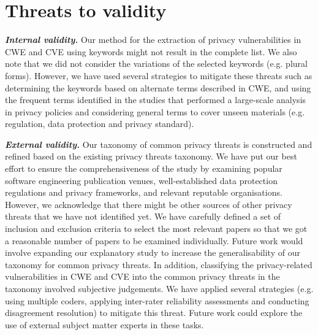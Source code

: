 \section{Threats to validity} \label{sec:threats}

\textit{\textbf{Internal validity.}} Our method for the extraction of privacy vulnerabilities in CWE and CVE using keywords might not result in the complete list. We also note that we did not consider the variations of the selected keywords (e.g. plural forms). However, we have used several strategies to mitigate these threats such as determining the keywords based on alternate terms described in CWE, and using the frequent terms identified in the studies that performed a large-scale analysis in privacy policies and considering general terms to cover unseen materials (e.g. regulation, data protection and privacy standard). 

\textit{\textbf{External validity.}} Our taxonomy of common privacy threats is constructed and refined based on the existing privacy threats taxonomy. We have put our best effort to ensure the comprehensiveness of the study by examining popular software engineering publication venues, well-established data protection regulations and privacy frameworks, and relevant reputable organisations. However, we acknowledge that there might be other sources of other privacy threats that we have not identified yet. We have carefully defined a set of inclusion and exclusion criteria to select the most relevant papers so that we got a reasonable number of papers to be examined individually. Future work would involve expanding our explanatory study to increase the generalisability of our taxonomy for common privacy threats. In addition, classifying the privacy-related vulnerabilities in CWE and CVE into the common privacy threats in the taxonomy involved subjective judgements. We have applied several strategies (e.g. using multiple coders, applying inter-rater reliability assessments and conducting disagreement resolution) to mitigate this threat. Future work could explore the use of external subject matter experts in these tasks.

